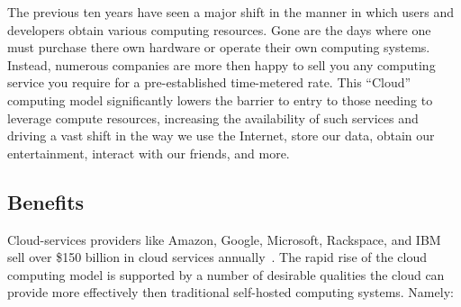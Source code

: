 The previous ten years have seen a major shift in the manner in which
users and developers obtain various computing resources. Gone are the
days where one must purchase there own hardware or operate their own
computing systems. Instead, numerous companies are more then happy to
sell you any computing service you require for a pre-established
time-metered rate. This ``Cloud'' computing model significantly lowers
the barrier to entry to those needing to leverage compute resources,
increasing the availability of such services and driving a vast shift
in the way we use the Internet, store our data, obtain our
entertainment, interact with our friends, and more.

\subsection{Benefits}

Cloud-services providers like Amazon, Google, Microsoft, Rackspace,
and IBM sell over \$150 billion in cloud services
annually~\cite{flood2013}. The rapid rise of the cloud computing model
is supported by a number of desirable qualities the cloud can provide
more effectively then traditional self-hosted computing
systems. Namely:

